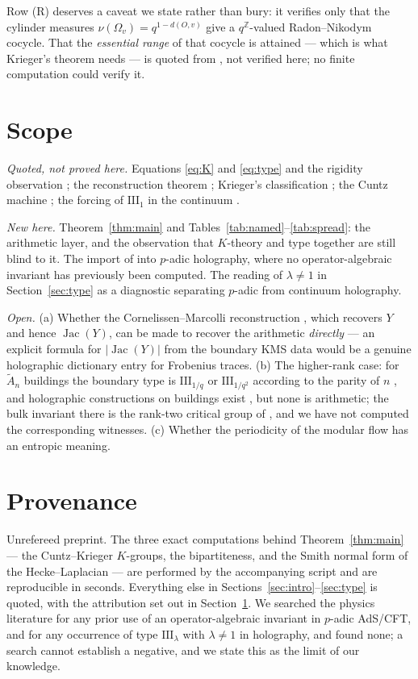 \documentclass[11pt]{article}
\theoremstyle{plain}
\theoremstyle{remark}
\newcommand{\Z}{\mathbb{Z}}
\newcommand{\Jac}{\operatorname{Jac}}
\newcommand{\III}{\mathrm{III}}
\begin{document}
Row (R) deserves a caveat we state rather than bury: it verifies only that the cylinder
measures $\nu(\Omega_v)=q^{1-d(O,v)}$ give a $q^{\Z}$-valued Radon--Nikodym cocycle. That
the \emph{essential range} of that cocycle is attained --- which is what Krieger's theorem
\cite{Krieger76} needs --- is quoted from \cite{RR97,Rob05}, not verified here; no finite
computation could verify it.

\section{Scope}\label{sec:scope}

\emph{Quoted, not proved here.} Equations \eqref{eq:K} and \eqref{eq:type} and the
rigidity observation \cite{Rob05}; the reconstruction theorem \cite{CM13}; Krieger's
classification \cite{Krieger76}; the Cuntz machine \cite{Cuntz81}; the forcing of
$\III_1$ in the continuum \cite{FLMO23,Wiesbrock93,BDF87}.

\emph{New here.} Theorem~\ref{thm:main} and Tables~\ref{tab:named}--\ref{tab:spread}: the
arithmetic layer, and the observation that $K$-theory and type together are still blind to
it. The import of \cite{Rob05,CM13} into $p$-adic holography, where no operator-algebraic
invariant has previously been computed. The reading of $\lambda\ne1$ in
Section~\ref{sec:type} as a diagnostic separating $p$-adic from continuum holography.

\emph{Open.} (a) Whether the Cornelissen--Marcolli reconstruction \cite{CM13}, which
recovers $Y$ and hence $\Jac(Y)$, can be made to recover the arithmetic \emph{directly} ---
an explicit formula for $|\Jac(Y)|$ from the boundary KMS data would be a genuine
holographic dictionary entry for Frobenius traces. (b) The higher-rank case: for
$\widetilde A_n$ buildings the boundary type is $\III_{1/q}$ or $\III_{1/q^2}$ according to
the parity of $n$ \cite{CR03}, and holographic constructions on buildings exist
\cite{GMP22,Marcolli20}, but none is arithmetic; the bulk invariant there is the rank-two
critical group of \cite[X]{ANCFT}, and we have not computed the corresponding witnesses.
(c) Whether the periodicity of the modular flow has an entropic meaning.

\section*{Provenance}

Unrefereed preprint. The three exact computations behind Theorem~\ref{thm:main} --- the
Cuntz--Krieger $K$-groups, the bipartiteness, and the Smith normal form of the
Hecke--Laplacian --- are performed by the accompanying script and are reproducible in
seconds. Everything else in Sections~\ref{sec:intro}--\ref{sec:type} is quoted, with the
attribution set out in Section~\ref{sec:scope}. We searched the physics literature for any
prior use of an operator-algebraic invariant in $p$-adic AdS/CFT, and for any occurrence of
type $\III_\lambda$ with $\lambda\ne1$ in holography, and found none; a search cannot
establish a negative, and we state this as the limit of our knowledge.
\end{document}

